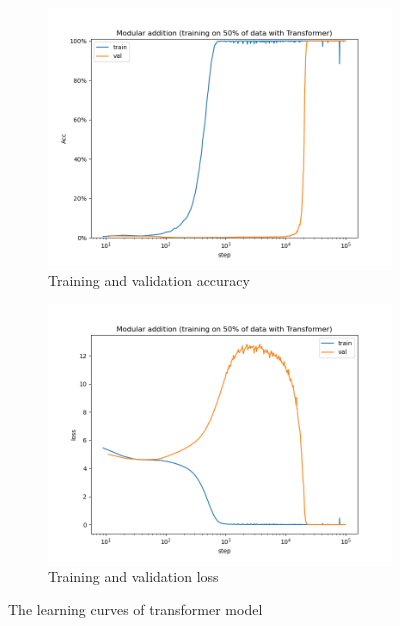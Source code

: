 \begin{figure}[!ht]
    \centering
    \begin{subfigure}{0.45\textwidth}
        \centering
        \includegraphics[width=\linewidth]{fig/grokking_curves/addition_50_Transformer_step.png}
        \caption{Training and validation accuracy}
        \label{fig:grokking_curve_transformer}
    \end{subfigure}
    \begin{subfigure}{0.45\textwidth}
        \centering
        \includegraphics[width=\linewidth]{fig/loss_curves/addition_50_Transformer_step.png}
        \caption{Training and validation loss}
        \label{fig:loss_curve_transformer}
    \end{subfigure}

    \caption{The learning curves of transformer model}
    \label{fig:acc_and_loss_transformer}
\end{figure}

